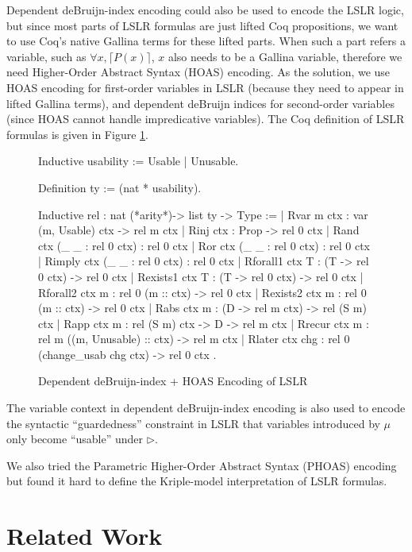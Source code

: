 \documentclass[preprint]{sigplanconf}
\newcommand{\later}{\triangleright}
\begin{document}
Dependent deBruijn-index encoding could also be used to encode the LSLR logic, but since most parts of LSLR formulas are just lifted Coq propositions, we want to use Coq's native Gallina terms for these lifted parts. When such a part refers a variable, such as $\forall x,\lceil P(x)\rceil$, $x$ also needs to be a Gallina variable, therefore we need Higher-Order Abstract Syntax (HOAS) encoding. As the solution, we use HOAS encoding for first-order variables in LSLR (because they need to appear in lifted Gallina terms), and dependent deBruijn indices for second-order variables (since HOAS cannot handle impredicative variables). The Coq definition of LSLR formulas is given in Figure \ref{coq-lslr}.

\begin{figure}
\begin{coq}
Inductive usability := Usable | Unusable.

Definition ty := (nat * usability).

Inductive rel : nat (*arity*)-> list ty -> Type :=
| Rvar {m ctx} : var (m, Usable) ctx -> rel m ctx
| Rinj {ctx} : Prop -> rel 0 ctx
| Rand {ctx} (_ _ : rel 0 ctx) : rel 0 ctx
| Ror {ctx} (_ _ : rel 0 ctx) : rel 0 ctx
| Rimply {ctx} (_ _ : rel 0 ctx) : rel 0 ctx
| Rforall1 {ctx T} : (T -> rel 0 ctx) -> rel 0 ctx
| Rexists1 {ctx T} : (T -> rel 0 ctx) -> rel 0 ctx
| Rforall2 {ctx m} : rel 0 (m :: ctx) -> rel 0 ctx
| Rexists2 {ctx m} : rel 0 (m :: ctx) -> rel 0 ctx
| Rabs {ctx m} : (D -> rel m ctx) -> rel (S m) ctx
| Rapp {ctx m} : rel (S m) ctx -> D -> rel m ctx
| Rrecur {ctx m} : rel m ((m, Unusable) :: ctx) -> rel m ctx
| Rlater {ctx} chg : rel 0 (change_usab chg ctx) -> rel 0 ctx
.
\end{coq}
\caption{\label{coq-lslr}Dependent deBruijn-index + HOAS Encoding of LSLR}
\end{figure}

The variable context in dependent deBruijn-index encoding is also used to encode the syntactic ``guardedness'' constraint in LSLR that variables introduced by $\mu$ only become ``usable'' under $\later$.

We also tried the Parametric Higher-Order Abstract Syntax (PHOAS) encoding but found it hard to define the Kriple-model interpretation of LSLR formulas.

\section{\label{section-related}Related Work}
\end{document}
